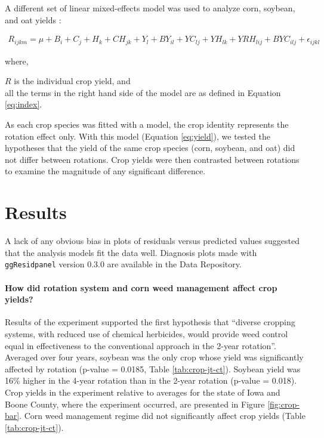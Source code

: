 \documentclass[
]{article}
\begin{document}
A different set of linear mixed-effects model was used to analyze corn, soybean, and oat yields \citep[\texttt{lme4} version 1.1-27.1,][]{batesLme4LinearMixedEffects2021}:

\begin{align}
R_{ijkm} = \mu + B_i + C_j + H_k + CH_{jk} + Y_l + BY_{il} + YC_{lj} + YH_{lk}  + YRH_{lij} + BYC_{ilj} + \epsilon_{ijkl}
\label{eq:yield}
\end{align}

where,

\(R\) is the individual crop yield, and\\
all the terms in the right hand side of the model are as defined in Equation \eqref{eq:index}.

As each crop species was fitted with a model, the crop identity represents the rotation effect only. With this model (Equation \eqref{eq:yield}), we tested the hypotheses that the yield of the same crop species (corn, soybean, and oat) did not differ between rotations. Crop yields were then contrasted between rotations to examine the magnitude of any significant difference.

\hypertarget{results}{%
\section*{Results}\label{results}}

A lack of any obvious bias in plots of residuals versus predicted values suggested that the analysis models fit the data well. Diagnosis plots made with \texttt{ggResidpanel} version 0.3.0 \citep{goodeGgResidpanelPanelsInteractive2019} are available in the Data Repository.

\hypertarget{how-did-rotation-system-and-corn-weed-management-affect-crop-yields}{%
\paragraph*{How did rotation system and corn weed management affect crop yields?}\label{how-did-rotation-system-and-corn-weed-management-affect-crop-yields}}

Results of the experiment supported the first hypothesis that ``diverse cropping systems, with reduced use of chemical herbicides, would provide weed control equal in effectiveness to the conventional approach in the 2-year rotation''. Averaged over four years, soybean was the only crop whose yield was significantly affected by rotation (p-value = 0.0185, Table \ref{tab:crop-jt-ct}). Soybean yield was 16\% higher in the 4-year rotation than in the 2-year rotation (p-value = 0.018). Crop yields in the experiment relative to averages for the state of Iowa and Boone County, where the experiment occurred, are presented in Figure \ref{fig:crop-bar}. Corn weed management regime did not significantly affect crop yields (Table \ref{tab:crop-jt-ct}).
\end{document}
